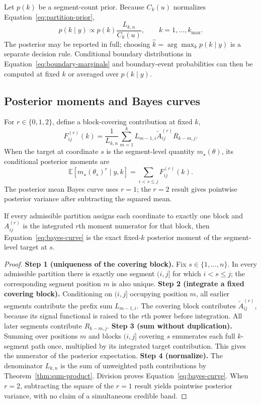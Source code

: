 Let $p(k)$ be a segment-count prior. Because $C_k(u)$ normalizes Equation~\eqref{eq:partition-prior},
\begin{equation}
 p(k\mid y)\propto p(k)\frac{L_{k,n}}{C_k(u)},
 \qquad k=1,\ldots,k_{\max}.
\label{eq:k-posterior}
\end{equation}
The posterior may be reported in full; choosing $\widehat k=\arg\max_k p(k\mid y)$ is a separate decision rule. Conditional boundary distributions in Equation~\eqref{eq:boundary-marginals} and boundary-event probabilities can then be computed at fixed $k$ or averaged over $p(k\mid y)$.

\subsection{Posterior moments and Bayes curves}
For $r\in\{0,1,2\}$, define a block-covering contribution at fixed $k$,
\begin{equation}
F^{(r)}_{ij}(k)
=\frac{1}{L_{k,n}}
  \sum_{m=1}^{k}L_{m-1,i}\widetilde A^{(r)}_{ij}R_{k-m,j}.
\label{eq:block-cover}
\end{equation}
When the target at coordinate $s$ is the segment-level quantity $m_\star(\theta)$, its conditional posterior moments are
\begin{equation}
\mathbb E\!\left[m_\star(\theta_s)^r\mid y,k\right]
 =\sum_{i<s\le j}F^{(r)}_{ij}(k).
\label{eq:bayes-curve}
\end{equation}
The posterior mean Bayes curve uses $r=1$; the $r=2$ result gives pointwise posterior variance after subtracting the squared mean.

\begin{proposition}
\label{prop:block-cover}
If every admissible partition assigns each coordinate to exactly one block and $A^{(r)}_{ij}$ is the integrated $r$th moment numerator for that block, then Equation~\eqref{eq:bayes-curve} is the exact fixed-$k$ posterior moment of the segment-level target at $s$.
\end{proposition}
\begin{proof}
\textbf{Step 1 (uniqueness of the covering block).}
Fix $s\in\{1,\ldots,n\}$. In every admissible partition there is exactly one segment $(i,j]$ for which $i<s\le j$; the corresponding segment position $m$ is also unique.
\textbf{Step 2 (integrate a fixed covering block).}
Conditioning on $(i,j]$ occupying position $m$, all earlier segments contribute the prefix sum $L_{m-1,i}$. The covering block contributes $\widetilde A^{(r)}_{ij}$, because its signal functional is raised to the $r$th power before integration. All later segments contribute $R_{k-m,j}$.
\textbf{Step 3 (sum without duplication).}
Summing over positions $m$ and blocks $(i,j]$ covering $s$ enumerates each full $k$-segment path once, multiplied by its integrated target contribution. This gives the numerator of the posterior expectation.
\textbf{Step 4 (normalize).}
The denominator $L_{k,n}$ is the sum of unweighted path contributions by Theorem~\ref{thm:sum-product}. Division proves Equation~\eqref{eq:bayes-curve}. When $r=2$, subtracting the square of the $r=1$ result yields pointwise posterior variance, with no claim of a simultaneous credible band.
\end{proof}

